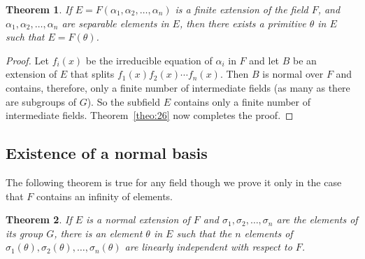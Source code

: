 \documentclass[10pt,leqno]{article}
\newtheorem{theo}{Theorem}
\theoremstyle{definition}
\begin{document}
\begin{theo}
\label{theo:27}
If $E = F(\alpha_1, \alpha_2, \ldots, \alpha_n)$ is a finite extension of the field $F$, and $\alpha_1, \alpha_2, \ldots, \alpha_n$ are separable elements in $E$, then there exists a primitive $\theta$ in $E$ such that $E = F(\theta)$.
\end{theo}


\begin{proof}
Let $f_i(x)$ be the irreducible equation of $\alpha_i$ in $F$ and let $B$ be an extension of $E$ that splits $f_1(x) f_2(x) \cdots f_n(x)$.
Then $B$ is normal over $F$ and contains, therefore, only a finite number of intermediate fields (as many as there are subgroups of $G$).
So the subfield $E$ contains only a finite number of intermediate fields.
Theorem~\ref{theo:26} now completes the proof.
\end{proof}



\subsection{Existence of a normal basis}

The following theorem is true for any field though we prove it only in the case that $F$ contains an infinity of elements.


\begin{theo}
\label{theo:28}
If $E$ is a normal extension of $F$ and $\sigma_1, \sigma_2, \ldots, \sigma_n$ are the elements of its group $G$, there is an element $\theta$ in $E$ such that the $n$ elements of $\sigma_1(\theta), \sigma_2(\theta), \ldots, \sigma_n(\theta)$ are linearly independent with respect to $F$.
\end{theo}
\end{document}
